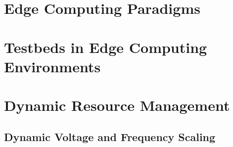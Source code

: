 \section{Edge Computing Paradigms}

\section{Testbeds in Edge Computing Environments}


\section{Dynamic Resource Management}

\subsection{Dynamic Voltage and Frequency Scaling}

